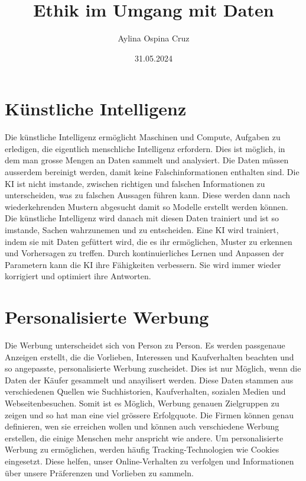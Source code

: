 \documentclass{article}
\title{Ethik im Umgang mit Daten}
\author{Aylina Ospina Cruz}
\date{31.05.2024}
\begin{document}
\maketitle



\tableofcontents


\section{Künstliche Intelligenz}

Die künstliche Intelligenz ermöglicht Maschinen und Compute,  Aufgaben zu erledigen, die eigentlich menschliche Intelligenz erfordern. Dies ist möglich, in dem man grosse Mengen an Daten sammelt und analysiert. Die Daten müssen ausserdem bereinigt werden, damit keine Falschinformationen enthalten sind. Die KI ist nicht imstande, zwischen richtigen und falschen Informationen zu unterscheiden, was zu falschen Aussagen führen kann. Diese werden dann nach wiederkehrenden Mustern abgesucht damit so Modelle erstellt werden können. Die künstliche Intelligenz wird danach mit diesen Daten trainiert und ist so imstande, Sachen wahrzunemen und zu entscheiden. Eine KI wird trainiert, indem sie mit Daten gefüttert wird, die es ihr ermöglichen, Muster zu erkennen und Vorhersagen zu treffen. Durch kontinuierliches Lernen und Anpassen der Parametern kann die KI ihre Fähigkeiten verbessern. Sie wird immer wieder korrigiert und optimiert ihre Antworten. 

\section{Personalisierte Werbung}
 Die Werbung unterscheidet sich von Person zu Person. Es werden passgenaue Anzeigen erstellt, die die Vorlieben, Interessen und Kaufverhalten beachten und so angepasste, personalisierte Werbung zuscheidet. Dies ist nur Möglich, wenn die Daten der Käufer gesammelt und anayilisert werden. Diese Daten stammen aus verschiedenen Quellen wie Suchhistorien, Kaufverhalten, sozialen Medien und Webseitenbesuchen. Somit ist es Möglich, Werbung genauen Zielgruppen zu zeigen und so hat man eine viel grössere Erfolgquote. Die Firmen können genau definieren, wen sie erreichen wollen und können auch verschiedene Werbung erstellen, die einige Menschen mehr anspricht wie andere. Um personalisierte Werbung zu ermöglichen, werden häufig Tracking-Technologien wie Cookies eingesetzt. Diese helfen, unser Online-Verhalten zu verfolgen und Informationen über unsere Präferenzen und Vorlieben zu sammeln. 
\end{document}
